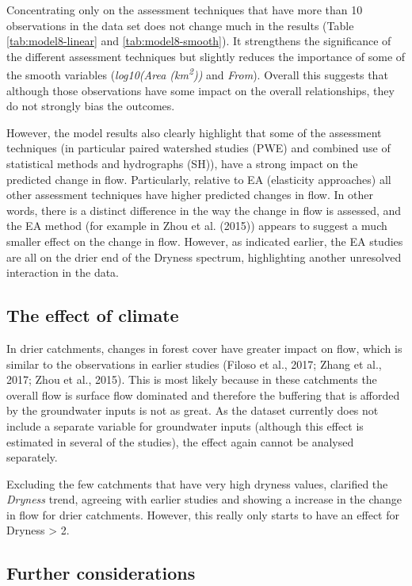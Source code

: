 \documentclass[]{elsarticle} %
\begin{document}
Concentrating only on the assessment techniques that have more than 10 observations in the data set does not change much in the results (Table \ref{tab:model8-linear} and \ref{tab:model8-smooth}). It strengthens the significance of the different assessment techniques but slightly reduces the importance of some of the smooth variables (\emph{log10(Area (km\textsuperscript{2}))} and \emph{From}). Overall this suggests that although those observations have some impact on the overall relationships, they do not strongly bias the outcomes.

However, the model results also clearly highlight that some of the assessment techniques (in particular paired watershed studies (PWE) and combined use of statistical methods and hydrographs (SH)), have a strong impact on the predicted change in flow. Particularly, relative to EA (elasticity approaches) all other assessment techniques have higher predicted changes in flow. In other words, there is a distinct difference in the way the change in flow is assessed, and the EA method (for example in Zhou et al. (2015)) appears to suggest a much smaller effect on the change in flow. However, as indicated earlier, the EA studies are all on the drier end of the Dryness spectrum, highlighting another unresolved interaction in the data.

\hypertarget{the-effect-of-climate}{%
\subsection{The effect of climate}\label{the-effect-of-climate}}

In drier catchments, changes in forest cover have greater impact on flow, which is similar to the observations in earlier studies (Filoso et al., 2017; Zhang et al., 2017; Zhou et al., 2015). This is most likely because in these catchments the overall flow is surface flow dominated and therefore the buffering that is afforded by the groundwater inputs is not as great. As the dataset currently does not include a separate variable for groundwater inputs (although this effect is estimated in several of the studies), the effect again cannot be analysed separately.

Excluding the few catchments that have very high dryness values, clarified the \emph{Dryness} trend, agreeing with earlier studies and showing a increase in the change in flow for drier catchments. However, this really only starts to have an effect for Dryness \textgreater{} 2.

\hypertarget{further-considerations}{%
\subsection{Further considerations}\label{further-considerations}}
\end{document}
